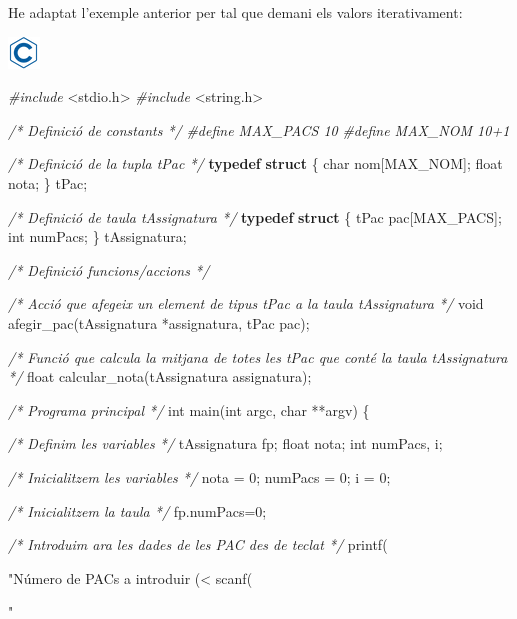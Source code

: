 \documentclass[]{book}
\newenvironment{Shaded}{\begin{snugshade}}{\end{snugshade}}
\newcommand{\KeywordTok}[1]{\textcolor[rgb]{0.13,0.29,0.53}{\textbf{#1}}}
\newcommand{\DataTypeTok}[1]{\textcolor[rgb]{0.13,0.29,0.53}{#1}}
\newcommand{\DecValTok}[1]{\textcolor[rgb]{0.00,0.00,0.81}{#1}}
\newcommand{\StringTok}[1]{\textcolor[rgb]{0.31,0.60,0.02}{#1}}
\newcommand{\ImportTok}[1]{#1}
\newcommand{\CommentTok}[1]{\textcolor[rgb]{0.56,0.35,0.01}{\textit{#1}}}
\newcommand{\PreprocessorTok}[1]{\textcolor[rgb]{0.56,0.35,0.01}{\textit{#1}}}
\newcommand{\NormalTok}[1]{#1}
\begin{document}
He adaptat l'exemple anterior per tal que demani els valors
iterativament:

\includegraphics{./img/c.png}

\begin{Shaded}
\begin{Highlighting}[]
\PreprocessorTok{#include }\ImportTok{<stdio.h>}
\PreprocessorTok{#include }\ImportTok{<string.h>}

\CommentTok{/* Definició de constants */}
\PreprocessorTok{#define MAX_PACS 10}
\PreprocessorTok{#define MAX_NOM 10+1}

\CommentTok{/* Definició de la tupla tPac */}
\KeywordTok{typedef} \KeywordTok{struct}\NormalTok{ \{}
    \DataTypeTok{char}\NormalTok{ nom[MAX_NOM];}
    \DataTypeTok{float}\NormalTok{ nota;}
\NormalTok{\} tPac;}

\CommentTok{/* Definició de taula tAssignatura */}
\KeywordTok{typedef} \KeywordTok{struct}\NormalTok{ \{}
\NormalTok{    tPac pac[MAX_PACS];}
    \DataTypeTok{int}\NormalTok{ numPacs;}
\NormalTok{\} tAssignatura;}

\CommentTok{/* Definició funcions/accions */}

\CommentTok{/* Acció que afegeix un element de tipus tPac a la taula tAssignatura */}
\DataTypeTok{void}\NormalTok{ afegir_pac(tAssignatura *assignatura, tPac pac);}

\CommentTok{/* Funció que calcula la mitjana de totes les tPac que conté la taula}
\CommentTok{   tAssignatura */}
\DataTypeTok{float}\NormalTok{ calcular_nota(tAssignatura assignatura);}

\CommentTok{/* Programa principal */} 
\DataTypeTok{int}\NormalTok{ main(}\DataTypeTok{int}\NormalTok{ argc, }\DataTypeTok{char}\NormalTok{ **argv) \{}

    \CommentTok{/* Definim les variables */}
\NormalTok{    tAssignatura fp;}
    \DataTypeTok{float}\NormalTok{ nota;}
    \DataTypeTok{int}\NormalTok{ numPacs, i;}

    \CommentTok{/* Inicialitzem les variables */}
\NormalTok{    nota = }\DecValTok{0}\NormalTok{;}
\NormalTok{    numPacs = }\DecValTok{0}\NormalTok{;}
\NormalTok{    i = }\DecValTok{0}\NormalTok{;}

    \CommentTok{/* Inicialitzem la taula */}
\NormalTok{    fp.numPacs=}\DecValTok{0}\NormalTok{;}

    \CommentTok{/* Introduim ara les dades de les PAC des de teclat */}
\NormalTok{    printf(}\StringTok{"Número de PACs a introduir (<%
\NormalTok{    scanf(}\StringTok{"%

}}
\end{Highlighting}
\end{Shaded}
\end{document}
